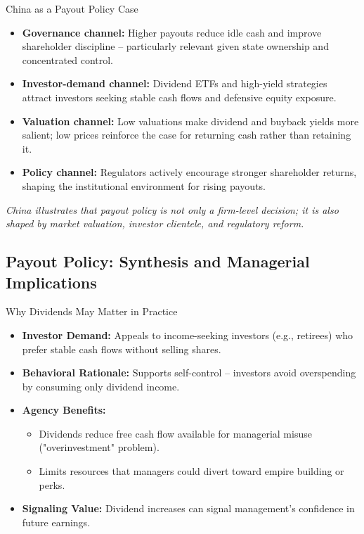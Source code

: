 \begin{frame}{China as a Payout Policy Case}
\footnotesize
\begin{itemize}
    \item \textbf{Governance channel:} Higher payouts reduce idle cash and improve shareholder discipline -- particularly relevant given state ownership and concentrated control.

    \item \textbf{Investor-demand channel:} Dividend ETFs and high-yield strategies attract investors seeking stable cash flows and defensive equity exposure.

    \item \textbf{Valuation channel:} Low valuations make dividend and buyback yields more salient; low prices reinforce the case for returning cash rather than retaining it.

    \item \textbf{Policy channel:} Regulators actively encourage stronger shareholder returns, shaping the institutional environment for rising payouts.
\end{itemize}
\vspace{2mm}
\begin{block}{}
\centering
\textit{China illustrates that payout policy is not only a firm-level decision; it is also shaped by market valuation, investor clientele, and regulatory reform.}
\end{block}
\end{frame}

\subsection{Payout Policy: Synthesis and Managerial Implications}
\begin{frame}{Why Dividends May Matter in Practice}
\footnotesize
\begin{itemize}
    \item \textbf{Investor Demand:} Appeals to income-seeking investors (e.g., retirees) who prefer stable cash flows without selling shares.
    
    \item \textbf{Behavioral Rationale:} Supports self-control -- investors avoid overspending by consuming only dividend income.
    
    \item \textbf{Agency Benefits:}
    \begin{itemize}
        \item Dividends reduce free cash flow available for managerial misuse ("overinvestment" problem).
        \item Limits resources that managers could divert toward empire building or perks.
    \end{itemize}

    \item \textbf{Signaling Value:} Dividend increases can signal management's confidence in future earnings.
\end{itemize}
\end{frame}

